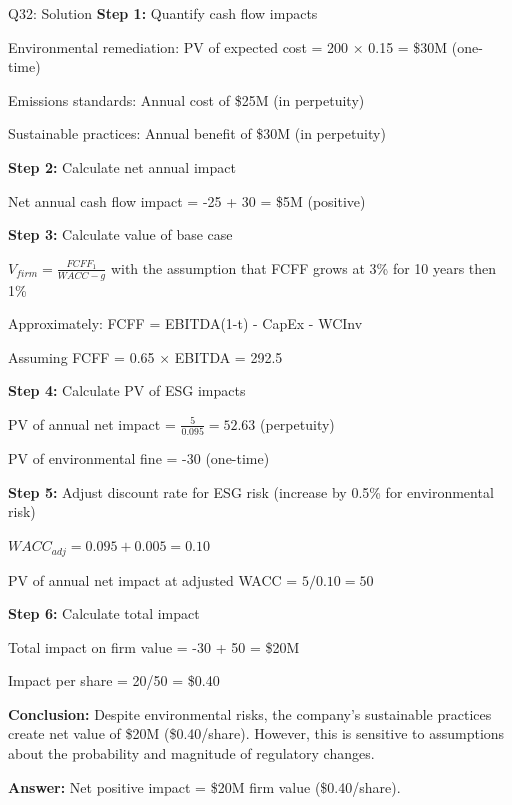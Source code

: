 \documentclass{beamer}
\renewcommand{\scriptsize}{\fontsize{6pt}{7pt}\selectfont}
\begin{document}
	\begin{frame}{Q32: Solution}
		\scriptsize
		\textbf{Step 1:} Quantify cash flow impacts
		
		Environmental remediation: PV of expected cost = 200 × 0.15 = \$30M (one-time)
		
		Emissions standards: Annual cost of \$25M (in perpetuity)
		
		Sustainable practices: Annual benefit of \$30M (in perpetuity)
		
		\vspace{2pt}
		\textbf{Step 2:} Calculate net annual impact
		
		Net annual cash flow impact = -25 + 30 = \$5M (positive)
		
		\vspace{2pt}
		\textbf{Step 3:} Calculate value of base case
		
		$V_{firm} = \frac{FCFF_1}{WACC - g}$ with the assumption that FCFF grows at 3\% for 10 years then 1\%
		
		Approximately: FCFF = EBITDA(1-t) - CapEx - WCInv
		
		Assuming FCFF = 0.65 × EBITDA = 292.5
		
		\vspace{2pt}
		\textbf{Step 4:} Calculate PV of ESG impacts
		
		PV of annual net impact = $\frac{5}{0.095} = 52.63$ (perpetuity)
		
		PV of environmental fine = -30 (one-time)
		
		\vspace{2pt}
		\textbf{Step 5:} Adjust discount rate for ESG risk (increase by 0.5\% for environmental risk)
		
		$WACC_{adj} = 0.095 + 0.005 = 0.10$
		
		PV of annual net impact at adjusted WACC = $5/0.10 = 50$
		
		\vspace{2pt}
		\textbf{Step 6:} Calculate total impact
		
		Total impact on firm value = -30 + 50 = \$20M
		
		Impact per share = 20/50 = \$0.40
		
		\vspace{2pt}
		\textbf{Conclusion:} Despite environmental risks, the company's sustainable practices create net value of \$20M (\$0.40/share). However, this is sensitive to assumptions about the probability and magnitude of regulatory changes.
		
		\textbf{Answer:} Net positive impact = \$20M firm value (\$0.40/share).
	\end{frame}
	
\end{document}
